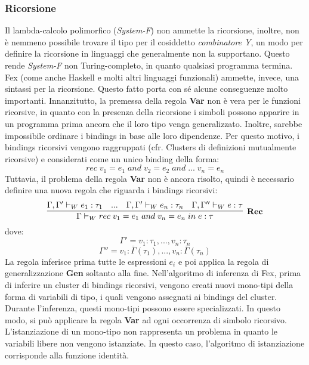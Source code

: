 \documentclass[10pt,a4paper]{article}
\begin{document}
\subsubsection{Ricorsione}
Il lambda-calcolo polimorfico (\textit{System-F}) non ammette la ricorsione, inoltre, non è nemmeno possibile
trovare il tipo per il cosiddetto \textit{combinatore Y}, un modo per definire la ricorsione in linguaggi che
generalmente non la supportano. Questo rende \textit{System-F} non Turing-completo, in quanto qualsiasi programma
termina. Fex (come anche Haskell e molti altri linguaggi funzionali) ammette, invece, una sintassi per la ricorsione.
Questo fatto porta con sé alcune conseguenze molto importanti. Innanzitutto, la premessa della regola \textbf{Var}
non è vera per le funzioni ricorsive, in quanto con la presenza della ricorsione i simboli possono apparire in un
programma prima ancora che il loro tipo venga generalizzato. Inoltre, sarebbe impossibile ordinare i bindings in base
alle loro dipendenze. Per questo motivo, i bindings ricorsivi vengono raggruppati
(cfr. Clusters di definizioni mutualmente ricorsive) e considerati come un unico binding della forma:
\[ rec \; v_1 = e_1 \; and \; v_2 = e_2 \; and \; ... \; v_n = e_n \]
Tuttavia, il problema della regola \textbf{Var} non è ancora risolto, quindi è necessario definire una nuova regola
che riguarda i bindings ricorsivi:
\[ \infer[\textbf{Rec}]{\Gamma \vdash_W rec \; v_1 = e_1 \; and \; v_n = e_n \; in \; e : \tau }{\Gamma, \Gamma' \vdash_W e_1 : \tau_1 & ... & \Gamma, \Gamma' \vdash_W e_n : \tau_n & \Gamma, \Gamma'' \vdash_W e : \tau } \]
dove:
\[ \Gamma' = v_1 : \tau_1, ..., v_n : \tau_n \]
\[ \Gamma'' = v_1 : \overline{\Gamma}(\tau_1), ..., v_n : \overline{\Gamma}(\tau_n) \]
La regola inferisce prima tutte le espressioni $ e_i $ e poi applica la regola di generalizzazione \textbf{Gen} soltanto
alla fine. Nell'algoritmo di inferenza di Fex, prima di inferire un cluster di bindings ricorsivi, vengono creati
nuovi mono-tipi della forma di variabili di tipo, i quali vengono assegnati ai bindings del cluster. Durante l'inferenza,
questi mono-tipi possono essere specializzati. In questo modo, si può applicare la regola
\textbf{Var} ad ogni occorrenza di simbolo ricorsivo. L'istanziazione di un mono-tipo non rappresenta un problema
in quanto le variabili libere non vengono istanziate. In questo caso, l'algoritmo di istanziazione corrisponde
alla funzione identità.
\end{document}
